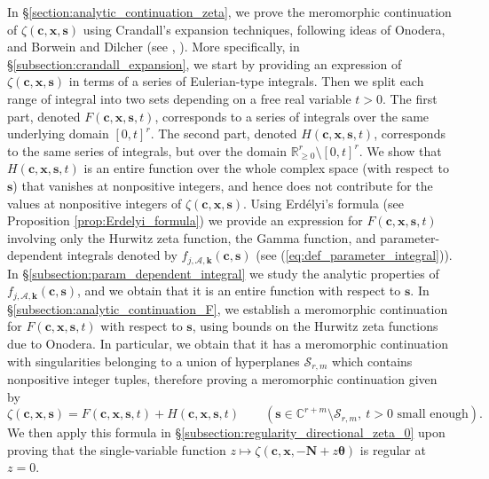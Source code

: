 \documentclass[a4paper]{amsart}
\theoremstyle{remark}
\theoremstyle{definition}
\begin{document}
In §\ref{section:analytic_continuation_zeta}, we prove the meromorphic continuation of $\zeta(\mathbf{c},\mathbf{x},\mathbf{s})$ using Crandall's expansion techniques, following ideas of Onodera, and Borwein and Dilcher (see \cite{onodera2021multiple}, \cite{borwein2018tornheim}). More specifically, in §\ref{subsection:crandall_expansion}, we start by providing an expression of $\zeta(\mathbf{c},\mathbf{x},\mathbf{s})$ in terms of a series of Eulerian-type integrals. Then we split each range of integral into two sets depending on a free real variable $t>0$. The first part, denoted $F(\mathbf{c},\mathbf{x},\mathbf{s},t)$, corresponds to a series of integrals over the same underlying domain $[0,t]^r$. The second part, denoted $H(\mathbf{c},\mathbf{x},\mathbf{s},t)$, corresponds to the same series of integrals, but over the domain $\mathbb{R}_{\geq 0}^r \setminus [0,t]^r$. We show that $H(\mathbf{c},\mathbf{x},\mathbf{s},t)$ is an entire function over the whole complex space (with respect to $\mathbf{s}$) that vanishes at nonpositive integers, and hence does not contribute for the values at nonpositive integers of $\zeta(\mathbf{c},\mathbf{x},\mathbf{s})$. Using Erdélyi's formula (see Proposition \ref{prop:Erdelyi_formula}) we provide an expression for $F(\mathbf{c},\mathbf{x},\mathbf{s},t)$ involving only the Hurwitz zeta function, the Gamma function, and parameter-dependent integrals denoted by $f_{j,\mathcal{A},\mathbf{k}}(\mathbf{c},\mathbf{s})$ (see (\ref{eq:def_parameter_integral})). In §\ref{subsection:param_dependent_integral} we study the analytic properties of $f_{j,\mathcal{A},\mathbf{k}}(\mathbf{c},\mathbf{s})$, and we obtain that it is an entire function with respect to $\mathbf{s}$. In §\ref{subsection:analytic_continuation_F}, we establish a meromorphic continuation for $F(\mathbf{c},\mathbf{x},\mathbf{s},t)$ with respect to $\mathbf{s}$, using bounds on the Hurwitz zeta functions due to Onodera. In particular, we obtain that it has a meromorphic continuation with singularities belonging to a union of hyperplanes $\mathcal{S}_{r,m}$ which contains nonpositive integer tuples, therefore proving a meromorphic continuation given by
$$ \zeta(\mathbf{c},\mathbf{x},\mathbf{s})=F(\mathbf{c},\mathbf{x},\mathbf{s},t)+H(\mathbf{c},\mathbf{x},\mathbf{s},t) \qquad (\mathbf{s} \in \mathbb{C}^{r+m} \setminus \mathcal{S}_{r,m}, \ t>0 \text{ small enough}). $$
We then apply this formula in §\ref{subsection:regularity_directional_zeta_0} upon proving that the single-variable function $z \mapsto \zeta(\mathbf{c},\mathbf{x},-\mathbf{N}+z\bm{\theta})$ is regular at $z=0$.
\end{document}
